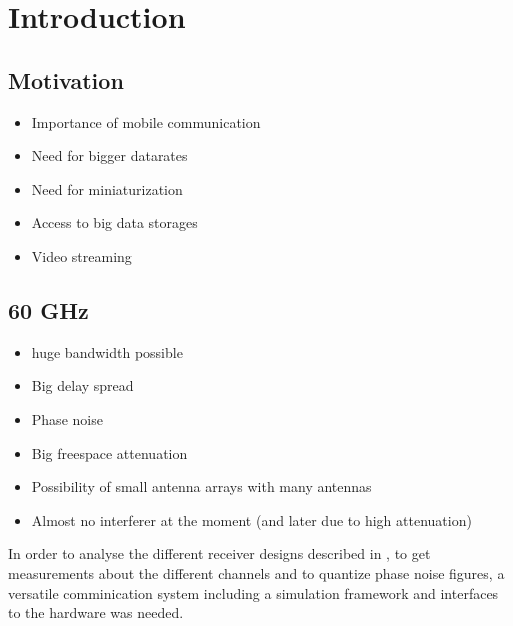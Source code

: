 \chapter{Introduction}
\label{ch:introduction}

\section{Motivation}

\begin{itemize}
\item Importance of mobile communication
\item Need for bigger datarates
\item Need for miniaturization
\item Access to big data storages
\item Video streaming
\end{itemize}

\section{60 GHz}

\begin{itemize}
\item huge bandwidth possible
\item Big delay spread
\item Phase noise
\item Big freespace attenuation
\item Possibility of small antenna arrays with many antennas
\item Almost no interferer at the moment (and later due to high attenuation)
\end{itemize}

In order to analyse the different receiver designs described in
, to get measurements about the different channels
and to quantize phase noise figures, a versatile comminication system
including a simulation framework and interfaces to the hardware
was needed. \\

